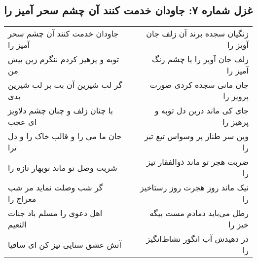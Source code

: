 \begin{center}
\section*{غزل شماره ۷: جاودان خدمت کنند آن چشم سحر آمیز را}
\label{sec:007}
\begin{longtable}{l p{0.5cm} r}
جاودان خدمت کنند آن چشم سحر آمیز را
&&
زنگیان سجده برند آن زلف جان آویز را
\\
توبه و پرهیز کردم ننگرم زین بیش من
&&
زلف جان آویز را یا چشم رنگ آمیز را
\\
گر لب شیرین آن بت بر لب شیرین بدی
&&
جان مانی سجده کردی صورت پرویز را
\\
با چنان زلف و چنان چشم دلاویز ای عجب
&&
جای کی ماند درین دل توبه و پرهیز را
\\
جان ما می را و قالب خاک را و دل ترا
&&
وین سر طناز پر وسواس تیغ تیز را
\\
شربت وصل تو ماند نوبهار تازه را
&&
ضربت هجر تو ماند ذوالفقار تیز را
\\
گر شب وصلت نماید مر شب معراج را
&&
نیک ماند روز هجرت روز رستاخیز را
\\
اهل دعوی را مسلم باد جنات النعیم
&&
رطل می‌باید دمادم مست بیگه خیز را
\\
آتش عشق سنایی تیز کن ای ساقیا
&&
در دهیدش آب انگور نشاط‌انگیز را
\\
\end{longtable}
\end{center}
